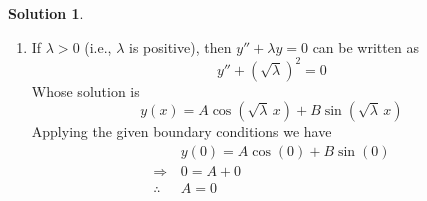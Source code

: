 \documentclass[12pt,a4paper]{article}
\theoremstyle{remark}
\theoremstyle{definition}
\newtheorem*{soln}{Solution}
\begin{document}
\begin{soln}
\begin{enumerate}[label={Case \arabic*:}]
              which has the solution
              \begin{equation}
                  \label{eq:eigenex2.2}
                  y(x)=Ae^{\sqrt{-\lambda}\,x}+Be^{-\sqrt{-\lambda}\,x}
              \end{equation}
              where $ -\lambda $ and $ \sqrt{-\lambda} $ are positive.\\
              Applying the boundary conditions we have
              \begin{align}
                               & y(0)=Ae^{0}+Be^{0}\notag   \\
                  \therefore\, & A+B=0\label{eq:eigenex2.3}
              \end{align}
              Differentiating both sides of equation \eqref{eq:eigenex2.2}, with respect to $ x $ we get,
              \begin{align}
                               & y'(x)=A\sqrt{-\lambda}e^{\sqrt{-\lambda}\,x}-B\sqrt{-\lambda}e^{-\sqrt{-\lambda}\,x}\notag                \\
                  \intertext{So,}
                               & y'(\pi)=A\sqrt{-\lambda}e^{\sqrt{-\lambda}\,\pi}-B\sqrt{-\lambda}e^{-\sqrt{-\lambda}\,\pi}\notag          \\
                  \therefore\, & A\sqrt{-\lambda}e^{\sqrt{-\lambda}\,\pi}-B\sqrt{-\lambda}e^{-\sqrt{-\lambda}\,\pi}=0\label{eq:eigenex2.4}
              \end{align}
              Solving equation \eqref{eq:eigenex2.3} and \eqref{eq:eigenex2.4} we get $ A=0 $ and $ B=0 $. Hence, from equation \eqref{eq:eigenex2.2} we have $ y=0 $. Which is not an eigenfunction.
        \item If $ \lambda>0 $ (i.e., $ \lambda $ is positive),
              then $ y''+\lambda y=0 $ can be written as
              \[y''+\left( \sqrt{\lambda} \right)^2=0\]
              Whose solution is
              \begin{equation}
                  y(x)=A\cos(\sqrt{\lambda} \,x)+B\sin(\sqrt{\lambda}\, x) \label{eq:eigenex2.5}
              \end{equation}
              Applying the given boundary conditions we have
              \begin{align*}
                                & y(0)=A\cos(0)+B\sin(0) \\
                  \Rightarrow\, & 0=A+0                  \\
                  \therefore\,  & A=0
              \end{align*}

\end{enumerate}
\end{soln}
\end{document}
